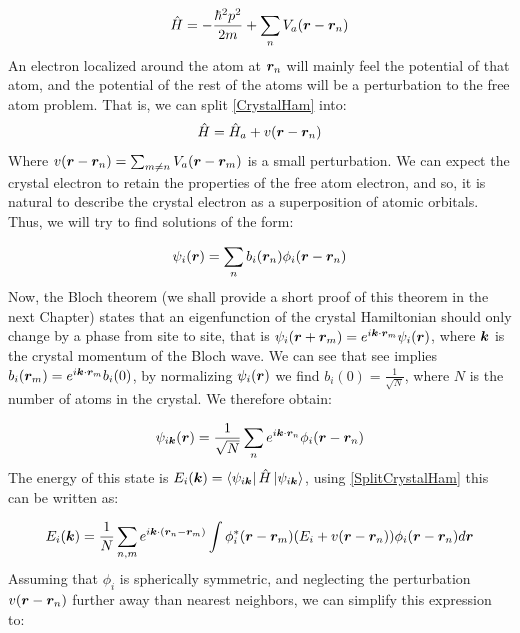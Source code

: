 \begin{equation}
\label{CrystalHam}
\hat{H} = -\frac{\hbar^2p^2}{2m} + \sum_n V_a(\boldsymbol{r}-\boldsymbol{r}_n)
\end{equation}
An electron localized around the atom at $\boldsymbol{r}_n$ will mainly feel the potential of that atom, and the potential of the rest of the atoms will be a perturbation to the free atom problem. That is, we can split \ref{CrystalHam} into:
\begin{equation}
\label{SplitCrystalHam}
\hat{H} = \hat{H}_a + v(\boldsymbol{r}-\boldsymbol{r}_n)
\end{equation}
Where $v(\boldsymbol{r}-\boldsymbol{r}_n) = \sum_{m \neq n} V_a(\boldsymbol{r}-\boldsymbol{r}_m)$ is a small perturbation. We can expect the crystal electron to retain the properties of the free atom electron, and so, it is natural to describe the crystal electron as a superposition of atomic orbitals. Thus, we will try to find solutions of the form:

\begin{equation}
\psi_i(\boldsymbol{r}) = \sum_n b_i(\boldsymbol{r}_n) \phi_i(\boldsymbol{r}-\boldsymbol{r}_n)
\end{equation}
Now, the Bloch theorem (we shall provide a short proof of this theorem in the next Chapter) states that an eigenfunction of the crystal Hamiltonian should only change by a phase from site to site, that is $\psi_i(\boldsymbol{r}+\boldsymbol{r}_m)=e^{i \boldsymbol{k} \cdot \boldsymbol{r}_m}\psi_i(\boldsymbol{r})$, where $\boldsymbol{k}$ is the crystal momentum of the Bloch wave. We can see that see implies $b_i(\boldsymbol{r}_m) = e^{i \boldsymbol{k} \cdot \boldsymbol{r}_m}b_i(0)$, by normalizing $\psi_i(\boldsymbol{r})$ we find $b_i(0) = \frac{1}{\sqrt{N}}$, where $N$ is the number of atoms in the crystal. We therefore obtain:

\begin{equation}
\psi_{i\boldsymbol{k}}(\boldsymbol{r}) = \frac{1}{\sqrt{N}}\sum_n  e^{i \boldsymbol{k} \cdot \boldsymbol{r}_n} \phi_i(\boldsymbol{r}-\boldsymbol{r}_n)
\end{equation}
The energy of this state is $E_i(\boldsymbol{k}) = \bra{\psi_{i\boldsymbol{k}}} \hat{H} \ket{\psi_{i\boldsymbol{k}}}$, using \ref{SplitCrystalHam} this can be written as:

\begin{equation}
E_i(\boldsymbol{k}) = \frac{1}{N} \sum_{n,m} e^{i\boldsymbol{k}\cdot(\boldsymbol{r}_n-\boldsymbol{r}_m)} \int \phi_i^*(\boldsymbol{r}-\boldsymbol{r}_m) (E_i+v(\boldsymbol{r}-\boldsymbol{r}_n)) \phi_i(\boldsymbol{r}-\boldsymbol{r}_n) d\boldsymbol{r}
\end{equation}
Assuming that $\phi_i$ is spherically symmetric, and neglecting the perturbation $v(\boldsymbol{r}-\boldsymbol{r}_n)$ further away than nearest neighbors, we can simplify this expression to:

